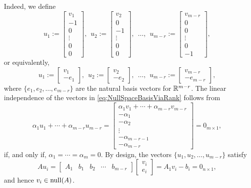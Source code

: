 Indeed, we define
\begin{equation}
\label{eq:NullSpaceBasisViaRank}
    u_1:= \left[ \begin{array}{c} v_1 \\ -1\\ 0 \\ \vdots \\ 0 \\ 0 \end{array} \right], ~~ u_2:= \left[ \begin{array}{c} v_2 \\ 0 \\ -1 \\ \vdots \\ 0 \\ 0 \end{array} \right],~~ \dots, ~~u_{m-r}:=  \left[ \begin{array}{c} v_{m-r} \\ 0 \\ 0 \\ \vdots \\ 0 \\ -1 \end{array} \right],
\end{equation}
or equivalently,
\begin{equation}
    u_1:= \left[ \begin{array}{c} v_1 \\ -e_1 \end{array} \right], ~~ u_2:= \left[ \begin{array}{c} v_2 \\ -e_2 \end{array} \right],~~ \dots,~~ u_{m-r}:=  \left[ \begin{array}{c} v_{m-r} \\ -e_{m-r}\end{array} \right],
\end{equation}
where $\{e_1, e_2, \ldots, e_{m-r} \}$ are the natural basis vectors for $\mathbb R^{m-r}$. The linear independence of the vectors in \eqref{eq:NullSpaceBasisViaRank} follows from 
$$\alpha_1 u_1 + \cdots + \alpha_{m-r} u_{m-r} = \left[ \begin{array}{c} \alpha_1 v_1 + \cdots +  \alpha_{m-r} v_{m-r} \\ -\alpha_1 \\ -\alpha_2\\ \vdots \\ -\alpha_{m-r-1} \\ -\alpha_{m-r} \end{array} \right] = 0_{m \times 1},$$
if, and only if, $\alpha_1 = \cdots = \alpha_{m} = 0.$ By design, the vectors $\{u_1, u_2, \ldots, u_{m-r} \}$ satisfy
$$ A u_i = \left[ \begin{array}{ccccc} A_1 & b_1 & b_2 & \cdots & b_{m-r} \end{array} \right]
\left[ \begin{array}{c} v_i \\ e_i \end{array} \right] = A_1 v_i - b_i = 0_{n \times 1}, $$
and hence $v_i \in \mathrm{null}(A)$. \\

